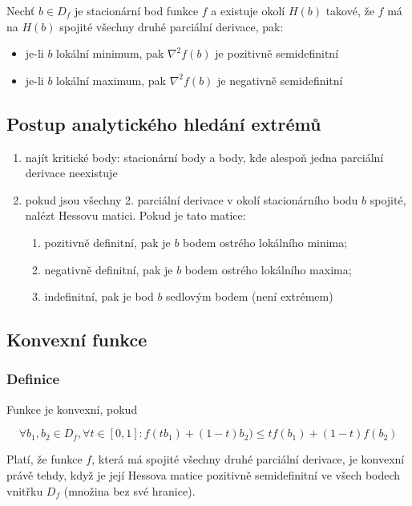 Nechť $b \in D_f$ je stacionární bod funkce $f$ a existuje okolí $H(b)$ takové, že $f$ má na $H(b)$ spojité všechny druhé parciální derivace, pak:

\begin{itemize}
    \item je-li $b$ lokální minimum, pak $\nabla^2 f(b)$ je pozitivně semidefinitní
    \item je-li $b$ lokální maximum, pak $\nabla^2 f(b)$ je negativně semidefinitní
\end{itemize}

\subsection{Postup analytického hledání extrémů}

\begin{enumerate}
    \item najít kritické body: stacionární body a body, kde alespoň jedna parciální derivace neexistuje
    \item pokud jsou všechny 2. parciální derivace v okolí stacionárního bodu $b$ spojité, nalézt Hessovu matici. Pokud je tato matice:
    \begin{enumerate}
        \item pozitivně definitní, pak je $b$ bodem ostrého lokálního minima;
        \item negativně definitní, pak je $b$ bodem ostrého lokálního maxima;
        \item indefinitní, pak je bod $b$ sedlovým bodem (není extrémem)
    \end{enumerate}
\end{enumerate}

\subsection{Konvexní funkce}

\subsubsection{Definice}

Funkce je konvexní, pokud

\begin{equation}
    \forall b_1, b_2 \in D_f , \forall t \in [0, 1] : f(tb_1) + (1 - t)b_2) \leq tf(b_1) + (1 - t)f(b_2)
\end{equation}

\noindent Platí, že funkce $f$, která má spojité všechny druhé parciální derivace, je konvexní právě tehdy, když je její Hessova matice pozitivně semidefinitní ve všech bodech vnitřku $D_f$ (množina bez své hranice).

